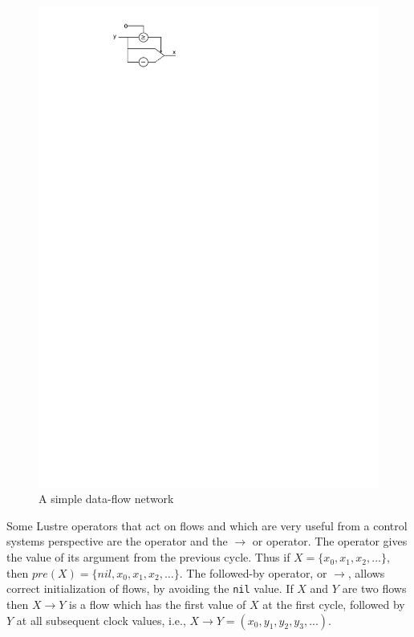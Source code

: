 \begin{figure}
\centering
\includegraphics{figs/scade_eq}
\caption{A simple data-flow network}
\label{fig:scade_eq}
\end{figure}

Some Lustre operators that act on flows and which are very useful from
a control systems perspective are the  operator and the $\to$
or  operator. The  operator gives the value of its
argument from the previous cycle. Thus if $X = \{x_0, x_1, x_2,
  \ldots\}$, then $pre(X) = \{nil, x_0, x_1, x_2, \ldots\}$. The
    followed-by operator,  or $\to$, allows correct
    initialization of flows, by avoiding the \texttt{nil} value. If
    $X$ and $Y$ are two flows then $X \to Y$ is a flow which has the
    first value of $X$ at the first cycle, followed by $Y$ at all
    subsequent clock values, i.e., $X \to Y = (x_0, y_1, y_2, y_3,
    ...)$.

